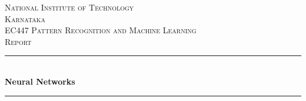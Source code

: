 \documentclass[12pt]{article}
\begin{document}
\begin{titlepage}

\newcommand{\HRule}{\rule{\linewidth}{0.5mm}} %

\center %
 

\textsc{\LARGE National Institute of Technology\\[0.2cm]Karnataka}\\[0.6cm] %
\textsc{\Large EC447 Pattern Recognition and Machine Learning}\\[0.5cm] %
\textsc{\large Report}\\[0.5cm] %


\HRule \\[0.4cm]
{ \huge \bfseries Neural Networks}\\[0.3cm] %
\HRule \\[0.3cm]
 


\end{titlepage}
\end{document}
